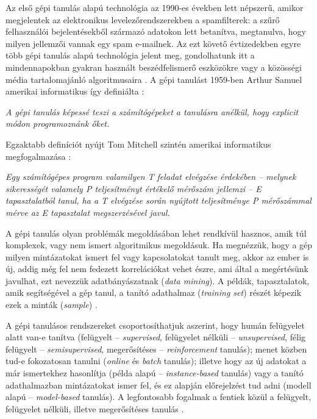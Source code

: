 \documentclass[12pt,a4paper]{article}
\begin{document}
Az első gépi tanulás alapú technológia az 1990-es években lett népszerű, amikor megjelentek az elektronikus levelezőrendszerekben a spamfilterek: a szűrő felhasználói bejelentésekből származó adatokon lett betanítva, megtanulva, hogy milyen jellemzői vannak egy spam e-mailnek. Az ezt követő évtizedekben egyre több gépi tanulás alapú technológia jelent meg, gondolhatunk itt a mindennapokban gyakran használt beszédfelismerő eszközökre vagy a közösségi média tartalomajánló algoritmusaira \cite{geron_hands-machine_2017}. A gépi tanulást 1959-ben Arthur Samuel amerikai informatikus így definiálta \cite{lee_machine_2017}: 
\begin{displayquote}
    \textit{A gépi tanulás képessé teszi a számítógépeket a tanulásra anélkül, hogy explicit módon programoznánk őket.} 
\end{displayquote}
Egzaktabb definíciót nyújt Tom Mitchell szintén amerikai informatikus megfogalmazása \cite{mitchell_discipline_2006}: 
\begin{displayquote}
\textit{Egy számítógépes program valamilyen T feladat elvégzése érdekében -- melynek sikerességét valamely P teljesítményt értékelő mérőszám jellemzi -- E tapasztalatból tanul, ha a T elvégzése során nyújtott teljesítménye P mérőszámmal mérve az E tapasztalat megszerzésével javul.} 
\end{displayquote}
A gépi tanulás olyan problémák megoldásában lehet rendkívül hasznos, amik túl komplexek, vagy nem ismert algoritmikus megoldásuk. Ha megnézzük, hogy a gép milyen mintázatokat ismert fel vagy kapcsolatokat tanult meg, akkor az ember is új, addig még fel nem fedezett korrelációkat vehet észre, ami által a megértésünk javulhat, ezt nevezzük adatbányászatnak (\textit{data mining}). A példák, tapasztalatok, amik segítségével a gép tanul, a tanító adathalmaz (\textit{training set}) részét képezik ezek a minták (\textit{sample}) \cite{geron_hands-machine_2017}. 

A gépi tanulásos rendszereket csoportosíthatjuk aszerint, hogy humán felügyelet alatt van-e tanítva (felügyelt -- \textit{supervised}, felügyelet nélküli -- \textit{unsupervised}, félig felügyelt -- \textit{semisupervised}, megerősítéses -- \textit{reinforcement} tanulás); menet közben tud-e fokozatosan tanulni (\textit{online} és \textit{batch} tanulás); illetve hogy az új adatokat a már ismertekhez hasonlítja (példa alapú -- \textit{instance-based} tanulás) vagy a tanító adathalmazban mintázatokat ismer fel, és ez alapján előrejelzést tud adni (modell alapú -- \textit{model-based} tanulás). A legfontosabb fogalmak a fentiek közül a felügyelt, felügyelet nélküli, illetve megerősítéses tanulás \cite{geron_hands-machine_2017}. 
\end{document}
